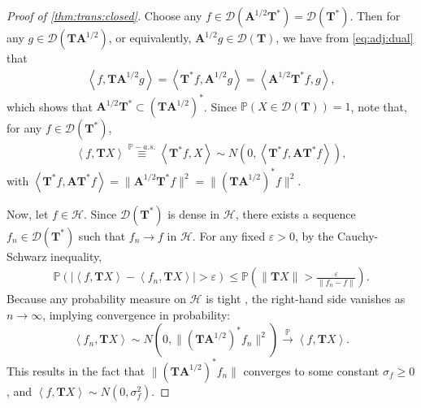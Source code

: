 \documentclass[noinfoline]{imsart}\setcounter{tocdepth}{2}
\renewcommand{\b}[1]{\mathbb{#1}} %
\newcommand{\m}[1]{\mathbf{#1}} %
\renewcommand{\c}[1]{\mathcal{#1}} %
\newcommand{\innpr}[2]{{\left\langle {#1},{#2}\right\rangle}} %
\theoremstyle{plain}
\begin{document}
\begin{proof}[Proof of \cref{thm:trans:closed}]
Choose any $f \in \c{D}(\m{A}^{1/2} \m{T}^{*}) = \c{D}(\m{T}^{*})$. Then for any $g \in \c{D}(\m{T} \m{A}^{1/2})$, or equivalently, $\m{A}^{1/2} g \in \c{D}(\m{T})$, we have from \eqref{eq:adj:dual} that
\begin{align*}
    \innpr{f}{\m{T} \m{A}^{1/2} g} = \innpr{\m{T}^{*} f}{\m{A}^{1/2} g} = \innpr{\m{A}^{1/2} \m{T}^{*} f}{g},
\end{align*}
which shows that $\m{A}^{1/2} \m{T}^{*} \subset (\m{T} \m{A}^{1/2})^{*}$. 
Since $\b{P}(X \in \c{D}(\m{T}))=1$, note that, for any $f \in \c{D}(\m{T}^{*})$,
\begin{align*}
    \innpr{f}{\m{T} X} \stackrel{\b{P}-a.s.}{\equiv} \innpr{\m{T}^{*} f}{X} \sim N(0, \innpr{\m{T}^{*} f}{\m{A} \m{T}^{*}f}),
\end{align*}
with $\innpr{\m{T}^{*} f}{\m{A} \m{T}^{*}f} = \| \m{A}^{1/2} \m{T}^{*}f \|^{2} = \|(\m{T} \m{A}^{1/2})^{*} f \|^{2}$.


Now, let $f \in \c{H}$. Since $\c{D}(\m{T}^{*})$ is dense in $\c{H}$, there exists a sequence $f_{n} \in \c{D}(\m{T}^{*})$ such that $f_{n} \to f$ in $\c{H}$. For any fixed $\varepsilon > 0$, by the Cauchy-Schwarz inequality,
\begin{align*}
    \b{P} \left( |\innpr{f}{\m{T} X} - \innpr{f_{n}}{\m{T} X} |>\varepsilon \right) \le \b{P} \left( \| \m{T} X \| > \frac{\varepsilon}{\|f_{n}-f\|} \right).
\end{align*}
Because any probability measure on $\c{H}$ is tight \cite{billingsley2013convergence}, the right-hand side vanishes as $n \to \infty$, implying convergence in probability:
\begin{equation}\label{eq:conv:prob}
    \innpr{f_{n}}{\m{T} X} \sim N(0, \|(\m{T} \m{A}^{1/2})^{*} f_{n} \|^{2}) \stackrel{\b{P}}{\rightarrow} \innpr{f}{\m{T} X}.
\end{equation}
This results in the fact that $\|(\m{T} \m{A}^{1/2})^{*} f_{n} \|$ converges to some constant $\sigma_{f} \ge 0$, and $\innpr{f}{\m{T} X} \sim N(0, \sigma_{f}^{2})$.


\end{proof}
\end{document}
